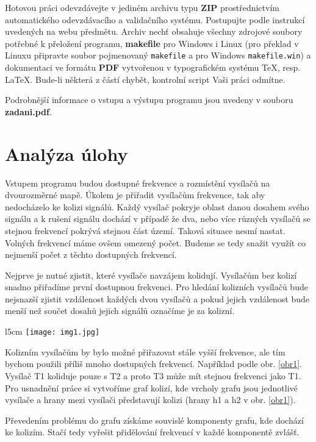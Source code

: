 \documentclass[12pt]{report}
\begin{document}
Hotovou práci odevzdávejte v jediném archivu typu \textbf{ZIP} prostřednictvím automatického odevzdávacího a validačního systému. Postupujte podle instrukcí uvedených na webu předmětu. Archiv nechť obsahuje všechny zdrojové soubory potřebné k přeložení programu, \textbf{makefile} pro Windows i Linux (pro překlad v Linuxu připravte soubor pojmenovaný \texttt{makefile} a pro Windows \texttt{makefile.win}) a dokumentaci ve formátu \textbf{PDF} vytvořenou v typografickém systému \TeX, resp. \LaTeX. Bude-li některá z částí chybět, kontrolní script Vaši práci odmítne.


Podrobnější informace o vstupu a výstupu programu jsou uvedeny v souboru \textbf{zadani.pdf}.

\chapter{Analýza úlohy}
Vstupem programu budou dostupné frekvence a rozmístění vysílačů na dvourozměrné mapě. Úkolem je přiřadit vysílačům frekvence, tak aby nedocházelo ke kolizi signálů. Každý vysílač pokryje oblast danou dosahem svého signálu a k rušení signálu dochází v případě že dva, nebo více různých vysílačů se stejnou frekvencí pokrývá stejnou část území. Taková situace nesmí nastat. Volných frekvencí máme ovšem omezený počet. Budeme se tedy snažit využít co nejmenší počet z těchto dostupných frekvencí.

Nejprve je nutné zjistit, které vysílače navzájem kolidují. Vysílačům bez kolizí snadno přiřadíme první dostupnou frekvenci. Pro hledání kolizních vysílačů bude nejsnazší zjistit vzdálenost každých dvou vysílačů a pokud jejich vzdálenost bude menší než součet dosahů jejich signálů označíme je za kolizní.

\begin{wrapfigure}[9]{l}{5cm}
\texttt{[image: img1.jpg]}
\caption{Kolize třech vysílačů.}
\label{obr1}
\end{wrapfigure}

Kolizním vysílačům by bylo možné přiřazovat stále vyšší frekvence, ale tím bychom použili příliš mnoho dostupných frekvencí. Například podle obr. \ref{obr1}. Vysílač T1 koliduje pouze s T2 a proto T3 může mít stejnou frekvenci jako T1. Pro usnadnění práce si vytvoříme graf kolizí, kde vrcholy grafu jsou jednotlivé vysílače a hrany mezi vysílači představují kolizi (hrany h1 a h2 v obr. \ref{obr1}). 


Převedením problému do grafu získáme souvislé komponenty grafu, kde dochází ke kolizím. Stačí tedy vyřešit přidělování frekvencí v každé komponentě zvlášť.
\end{document}
